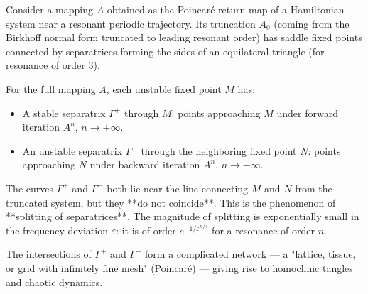 Consider a mapping $A$ obtained as the Poincaré return map of a Hamiltonian system near a resonant periodic trajectory. Its truncation $A_0$ (coming from the Birkhoff normal form truncated to leading resonant order) has saddle fixed points connected by separatrices forming the sides of an equilateral triangle (for resonance of order $3$).

For the full mapping $A$, each unstable fixed point $M$ has:
\begin{itemize}
\item A stable separatrix $\Gamma^+$ through $M$: points approaching $M$ under forward iteration $A^n$, $n \to +\infty$.
\item An unstable separatrix $\Gamma^-$ through the neighboring fixed point $N$: points approaching $N$ under backward iteration $A^n$, $n \to -\infty$.
\end{itemize}

The curves $\Gamma^+$ and $\Gamma^-$ both lie near the line connecting $M$ and $N$ from the truncated system, but they **do not coincide**. This is the phenomenon of **splitting of separatrices**. The magnitude of splitting is exponentially small in the frequency deviation $\varepsilon$: it is of order $e^{-1/\varepsilon^{n/4}}$ for a resonance of order $n$.

The intersections of $\Gamma^+$ and $\Gamma^-$ form a complicated network — a "lattice, tissue, or grid with infinitely fine mesh" (Poincaré) — giving rise to homoclinic tangles and chaotic dynamics.
